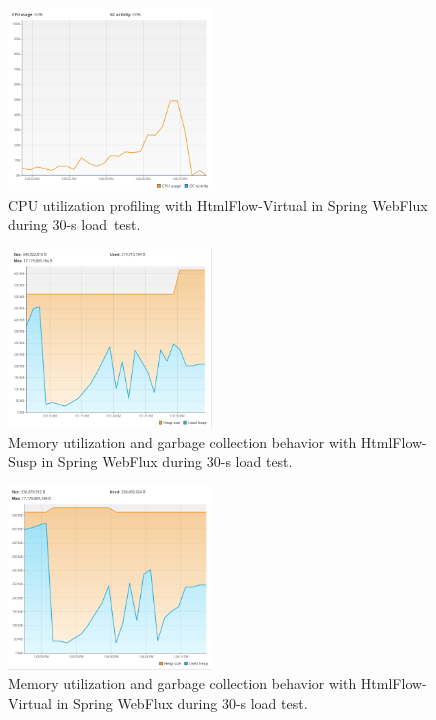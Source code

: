 \documentclass[software,article,accept,pdftex,moreauthors]{Definitions/mdpi}
\begin{document}
\begin{figure}[H]

     \includegraphics[width=0.48\textwidth]{./Graphs/cpu-virt.png}
     \caption{CPU utilization profiling with HtmlFlow-Virtual in Spring WebFlux during 30-s load~test.}   \label{fig:cpu-virt}
\end{figure}
     

\begin{figure}[H]
\vspace{-6pt}
    \includegraphics[width=0.48\textwidth]{./Graphs/mem-susp.png}
     \caption{Memory utilization and garbage collection behavior with HtmlFlow-Susp in Spring WebFlux during 30-s load test.}             \label{fig:gc-susp}
\end{figure}
     
     \begin{figure}[H]
\vspace{-6pt}
   \includegraphics[width=0.48\textwidth]{./Graphs/mem-virt.png}
     \caption{Memory utilization and garbage collection behavior with HtmlFlow-Virtual in Spring WebFlux during 30-s load test.} \label{fig:gc-virt}
\end{figure}
\end{document}
